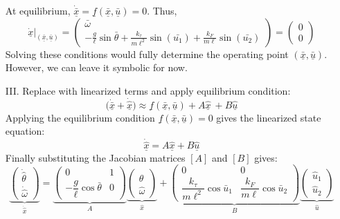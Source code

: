 ﻿\documentclass[12pt]{article}
\begin{document}
\begin{itemize}
    At equilibrium, $\dot{\underline{\bar{x}}} = \underline{f}(\underline{{\bar{x}}},\underline{\bar{u}}) = 0$. Thus,
    \[\dot{\underline{x}}\big|_{(\underline{\bar{x}}, \underline{\bar{u}})} = \begin{pmatrix} \bar{\omega} \\ -\frac{g}{\ell}\sin\bar{\theta} + \frac{k_\tau}{m\ell^2}\sin(\bar{u_1}) + \frac{k_F}{m\ell}\sin(\bar{u_2}) \end{pmatrix} = \begin{pmatrix} 0 \\ 0 \end{pmatrix}\]
    Solving these conditions would fully determine the operating point $(\underline{\bar{x}}, \underline{\bar{u}})$. However, we can leave it symbolic for now.
    \item [III.] Replace with linearized terms and apply equilibrium condition:\\
    \[\big(\underline{\dot{\bar{x}}}+\underline{\dot{\hat{x}}}\big)\approx \underline{f}(\underline{{\bar{x}}},\underline{\bar{u}})+ A \underline{\hat{x}}\ + B \underline{\hat{u}}\]
    Applying the equilibrium condition $\underline{f}(\underline{{\bar{x}}},\underline{\bar{u}}) = 0$ gives the linearized state equation:
    \[\underline{\dot{\hat{x}}} = A \underline{\hat{x}} + B \underline{\hat{u}}\]
    Finally substituting the Jacobian matrices $[A]$ and $[B]$ gives:
    \[
\renewcommand{\arraystretch}{2}
\boxed{
\underbrace{
\begin{pmatrix}
\dot{\hat{\theta}} \\
\dot{\hat{\omega}}
\end{pmatrix}
}_{\dot{\hat{x}}}
=
\underbrace{
\begin{pmatrix}
0 & 1 \\
-\dfrac{g}{\ell}\cos\bar{\theta} & 0
\end{pmatrix}
}_{A}
\underbrace{
\begin{pmatrix}
\hat{\theta} \\
\hat{\omega}
\end{pmatrix}
}_{\hat{x}}
+
\underbrace{
\begin{pmatrix}
0 & 0 \\
\dfrac{k_{\tau}}{m\ell^2}\cos\bar{u}_1 &
\dfrac{k_F}{m\ell}\cos\bar{u}_2
\end{pmatrix}
}_{B}
\underbrace{
\begin{pmatrix}
\hat{u}_1 \\
\hat{u}_2
\end{pmatrix}
}_{\hat{u}}
}
\]
\end{itemize}
\end{document}
